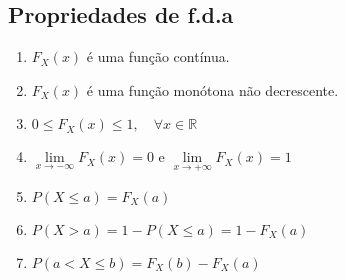      \subsection{Propriedades de f.d.a}
     \begin{enumerate}[label=(\alph*)]
       \item ${F}_{X}(x)$  é uma função contínua.
       \item ${F}_{X}(x)$ é uma função monótona não decrescente. 
       \item  $0 \le {F}_{X}(x)\le 1,\quad \forall x \in \mathbb{R}$
       \item $ \lim \limits_{x \to -\infty} {F}_{X}(x)=0$ e $ \lim \limits_{x \to +\infty} {F}_{X}(x)=1$
       \item $P(X \le a) = {F}_{X}(a)$
       \item $P(X>a)=1 - P(X \le a)= 1 - {F}_{X}(a)$
       \item $P(a<X\le b)= {F}_{X}(b)- {F}_{X}(a)$
     \end{enumerate}
